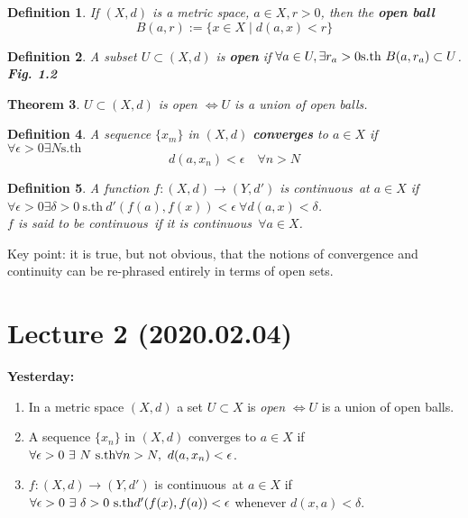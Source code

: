 \documentclass{article}
\newcommand{\sth}{\mathrm{s.th}\ }
\newcommand{\cts}{continuous\ }
\newtheorem{theorem}{Theorem}[section]
\newtheorem{definition}[theorem]{Definition}
\theoremstyle{remark}
\theoremstyle{example}
\theoremstyle{examples}
\begin{document}
	\begin{definition}
		If $(X,d)$ is a metric space, $a \in X, r > 0$, then the \textbf{open ball} \[B(a,r):=\{x \in X \mid d(a,x) < r \}\]
	\end{definition}

	\begin{definition}
		A subset $U \subset (X,d)$ is \textbf{open} if $\forall a \in U, \exists r_a > 0\\ \sth B(a,r_a) \subset U$. \textbf{Fig. 1.2}
	\end{definition}

	\begin{theorem}
		$U \subset(X,d)$ is open $\iff U$ is a union of open balls.
	\end{theorem}

	\begin{definition}
		A sequence $\{x_m\}$ in $(X,d)$ \textbf{converges} to $a \in X$ if\\
		$\forall \epsilon > 0 \exists N \sth$ \[d(a,x_n) < \epsilon\quad \forall n > N\]
	\end{definition}

	\begin{definition}
		A function $f:(X,d) \to (Y, d')$ is \cts at $a \in X$ if $\forall \epsilon > 0 \exists \delta > 0\ \sth d'(f(a), f(x))<\epsilon\ \forall d(a,x) < \delta$.\\
		$f$ is said to be \cts if it is \cts $\forall a \in X$.
	\end{definition}

	Key point: it is true, but not obvious, that the notions of convergence and continuity can be re-phrased entirely in terms of open sets.
	
	\section*{Lecture 2 (2020.02.04)}
	\textbf{Yesterday:}
	\begin{enumerate}
		\item In a metric space $(X,d)$ a set $U \subset X$ is \textit{open} $\iff U$ is a union of open balls.
		\item A sequence $\{x_n\}$ in $(X,d)$ converges to $a \in X$ if $\forall \epsilon > 0\ \exists\ N\ \sth \\
		\forall n > N,\ d(a, x_n)< \epsilon$.
		\item $f:(X,d) \to (Y,d')$ is \cts at $a \in X$ if $\forall \epsilon > 0\ \exists\ \delta > 0\ \sth\\
		d'(f(x),f(a)) < \epsilon$ whenever $d(x,a)< \delta$.
	\end{enumerate}
\end{document}
